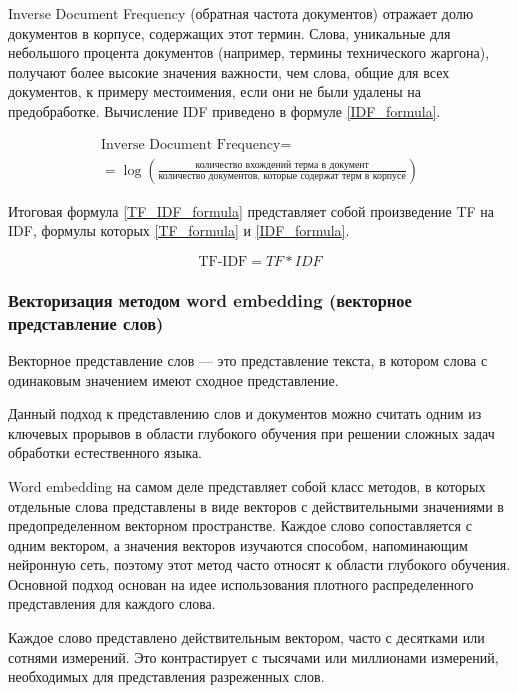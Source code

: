 Inverse Document Frequency (обратная частота документов) отражает долю документов в корпусе, содержащих этот термин. Слова, уникальные для небольшого процента документов (например, термины технического жаргона), получают более высокие значения важности, чем слова, общие для всех документов, к примеру местоимения, если они не были удалены на предобработке. Вычисление IDF приведено в формуле \ref{IDF_formula}.

\begin{equation}
\label{IDF_formula}
\begin{matrix}
\text{Inverse Document Frequency} =\\
 =\log{(\frac{\text{количество вхождений
			 терма в документ}}{\text{количество документов, которые содержат терм в корпусе}})}
\end{matrix}
\end{equation}

Итоговая формула \ref{TF_IDF_formula} представляет собой произведение TF на IDF, формулы которых \ref{TF_formula} и \ref{IDF_formula}.

\begin{equation}
\label{TF_IDF_formula}
\text{TF-IDF} = TF * IDF
\end{equation}

\subsubsection{Векторизация методом word embedding (векторное представление слов)}

Векторное представление слов --- это представление текста, в котором слова с одинаковым значением имеют сходное представление.

Данный подход к представлению слов и документов можно считать одним из ключевых прорывов в области глубокого обучения при решении сложных задач обработки естественного языка.

Word embedding на самом деле представляет собой класс методов, в которых отдельные слова представлены в виде векторов с действительными значениями в предопределенном векторном пространстве. Каждое слово сопоставляется с одним вектором, а значения векторов изучаются способом, напоминающим нейронную сеть, поэтому этот метод часто относят к области глубокого обучения. Основной подход основан на идее использования плотного распределенного представления для каждого слова.

Каждое слово представлено действительным вектором, часто с десятками или сотнями измерений. Это контрастирует с тысячами или миллионами измерений, необходимых для представления разреженных слов.

